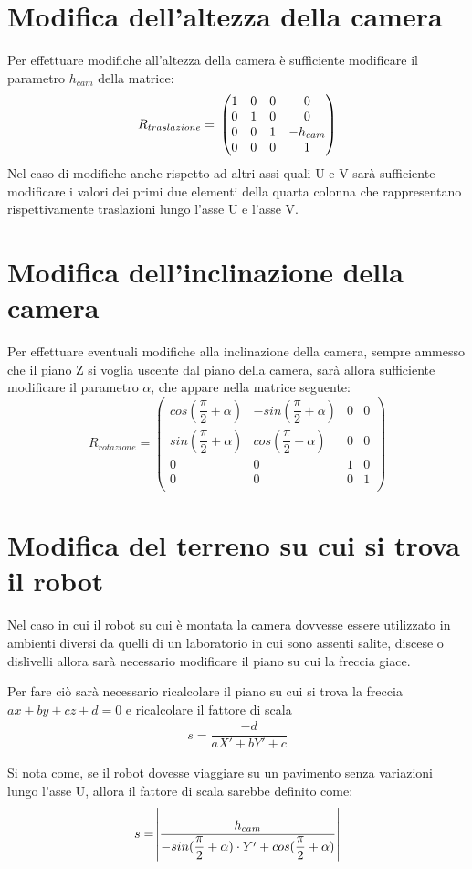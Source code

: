 \section{Modifica dell'altezza della camera}
Per effettuare modifiche all'altezza della camera è sufficiente modificare il parametro $h_{cam}$ della matrice:
\begin{equation}
	R_{traslazione} = \\
	\begin{pmatrix}
	1 & 0 & 0 & 0 \\
	0 & 1 & 0 & 0 \\
	0 & 0 & 1 & -h_{cam}\\
	0 & 0 & 0 & 1 \\
	\end{pmatrix}
\end{equation}
Nel caso di modifiche anche rispetto ad altri assi quali U e V sarà sufficiente modificare i valori dei primi due elementi della quarta colonna che rappresentano rispettivamente traslazioni lungo l'asse U e l'asse V.

\section{Modifica dell'inclinazione della camera}
Per effettuare eventuali modifiche alla inclinazione della camera, sempre ammesso che il piano Z si voglia uscente dal piano della camera, sarà allora sufficiente modificare il parametro $\alpha$, che appare nella matrice seguente:
\begin{equation}
	R_{rotazione} =
	\begin{pmatrix}
		cos(\dfrac{\pi}{2}+\alpha) & -sin(\dfrac{\pi}{2}+\alpha) & 0 & 0 \\
		sin(\dfrac{\pi}{2}+\alpha) & cos(\dfrac{\pi}{2}+\alpha)& 0 & 0 \\
		0 & 0 & 1 & 0 \\
		0 & 0 & 0 & 1 \\
	\end{pmatrix}
\end{equation}

\section{Modifica del terreno su cui si trova il robot}
Nel caso in cui il robot su cui è montata la camera dovvesse essere utilizzato in ambienti diversi da quelli di un laboratorio in cui sono assenti salite, discese o dislivelli allora sarà necessario modificare il piano su cui la freccia giace.

Per fare ciò sarà necessario ricalcolare il piano su cui si trova la freccia $ax+by+cz+d=0$ e ricalcolare il fattore di scala
\begin{equation}
	\begin{split}
	s = \dfrac{-d}{aX'+bY'+c}	
	\end{split}
\end{equation}

Si nota come, se il robot dovesse viaggiare su un pavimento senza variazioni lungo l'asse U, allora il fattore di scala sarebbe definito come:
$$
s = \abs{\dfrac{h_{cam}
	}{-sin(\dfrac{\pi}{2}+\alpha) \cdot Y'+ cos(\dfrac{\pi}{2}+\alpha)}}
$$